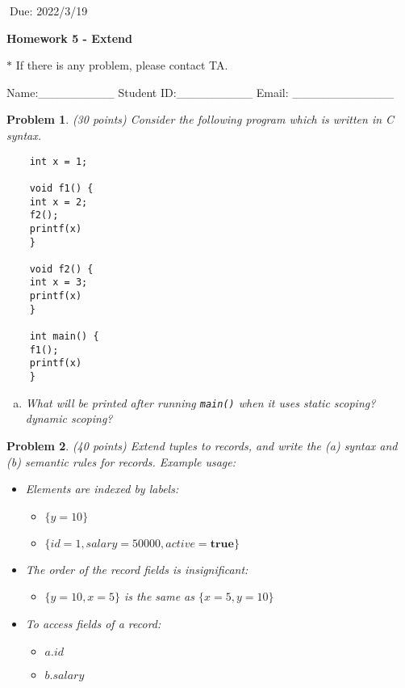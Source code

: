 \documentclass[12pt]{article}
\newtheorem{hw}{Problem}
\begin{document}
$\;$\hfill Due: 2022/3/19

\begin{center}
{\LARGE\bf Homework 5 - Extend}
\end{center}

\begin{center}
	\footnotesize{\color{red}$*$ If there is any problem, please contact TA.}
	
	\footnotesize{\color{blue} \quad Name:\_\_\_\_\_\_\_\_\_  \quad Student ID:\_\_\_\_\_\_\_\_\_ \quad Email: \_\_\_\_\_\_\_\_\_\_\_\_}
\end{center}

\begin{hw}\rm (30 points)
	Consider the following program which is written in C syntax.
	\begin{verbatim}
	int x = 1;
	
	void f1() {
	int x = 2;
	f2();
	printf(x)
	}
	
	void f2() {
	int x = 3;
	printf(x)
	}
	
	int main() {
	f1();
	printf(x)
	}
	\end{verbatim}
	\begin{enumerate}[(a)]
		\item What will be printed after running \texttt{main()} when it uses static scoping?
		dynamic scoping?
	\end{enumerate}
\end{hw}

\begin{hw}\rm (40 points)
	Extend tuples to records, and write the (a) syntax and (b) semantic rules for records.
	Example usage:
	\begin{itemize}
		\item Elements are indexed by labels:
		\begin{itemize}
			\item $\{y=10\}$
			\item $\{id=1,salary=50000,active=\mathbf{true}\}$
		\end{itemize}
		\item The order of the record fields is insignificant:
		\begin{itemize}
			\item $\{y=10,x=5\}$ is the same as $\{x=5,y=10\}$
		\end{itemize}
		\item To access fields of a record:
		\begin{itemize}
			\item $a.id$
			\item $b.salary$
		\end{itemize}
	\end{itemize}
\end{hw}
\end{document}
